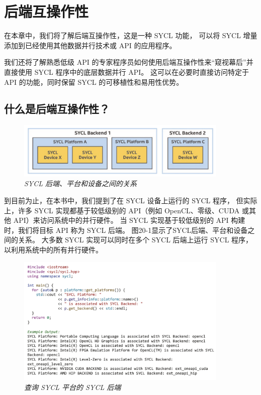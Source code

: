 \section{后端互操作性}
在本章中，我们将了解后端互操作性，这是一种 SYCL 功能，
可以将 SYCL 增量添加到已经使用其他数据并行技术或 API 的应用程序。

我们还将了解熟悉低级 API 的专家程序员如何使用后端互操作性来“窥视幕后”并直接使用 SYCL 程序中的底层数据并行 API。 
这可以在必要时直接访问特定于 API 的功能，同时保留 SYCL 的可移植性和易用性优势。

\subsection{什么是后端互操作性？}
\begin{figure}[H]
	\centering
	\includegraphics[width=0.9\textwidth]{figs/F20.1.png}
	\caption{\textit{SYCL 后端、平台和设备之间的关系 }}
\end{figure}

到目前为止，在本书中，我们提到了在 SYCL 设备上运行的 SYCL 程序，
但实际上，许多 SYCL 实现都基于较低级别的 API（例如 OpenCL、零级、CUDA 或其他 API）来访问系统中的并行硬件。 
当 SYCL 实现基于较低级别的 API 构建时，我们将目标 API 称为 SYCL 后端。 
图20-1显示了SYCL后端、平台和设备之间的关系。 
大多数 SYCL 实现可以同时在多个 SYCL 后端上运行 SYCL 程序，以利用系统中的所有并行硬件。

\begin{figure}[H]
	\centering
	\includegraphics[width=0.9\textwidth]{figs/F20.2.png}
	\caption{\textit{查询 SYCL 平台的 SYCL 后端 }}
\end{figure}

